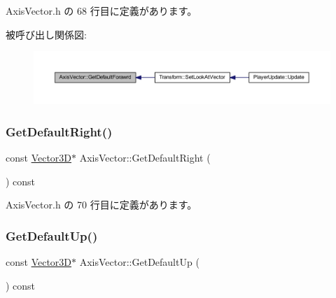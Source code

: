  Axis\+Vector.\+h の 68 行目に定義があります。

被呼び出し関係図\+:
\nopagebreak
\begin{figure}[H]
\begin{center}
\leavevmode
\includegraphics[width=350pt]{class_axis_vector_a83ead17514eb08954dc74c0e72b6158c_icgraph}
\end{center}
\end{figure}
\mbox{\label{class_axis_vector_aacf0879e0b9ace6cfbd29c8a300cd960}} 
\subsubsection{\texorpdfstring{Get\+Default\+Right()}{GetDefaultRight()}}
{\footnotesize\ttfamily const \mbox{\hyperlink{class_vector3_d}{Vector3D}}$\ast$ Axis\+Vector\+::\+Get\+Default\+Right (\begin{DoxyParamCaption}{ }\end{DoxyParamCaption}) const\hspace{0.3cm}{\ttfamily [inline]}}



 Axis\+Vector.\+h の 70 行目に定義があります。

\mbox{\label{class_axis_vector_a32f68ef0864e7b589d3c1996a61e11fc}} 
\subsubsection{\texorpdfstring{Get\+Default\+Up()}{GetDefaultUp()}}
{\footnotesize\ttfamily const \mbox{\hyperlink{class_vector3_d}{Vector3D}}$\ast$ Axis\+Vector\+::\+Get\+Default\+Up (\begin{DoxyParamCaption}{ }\end{DoxyParamCaption}) const\hspace{0.3cm}{\ttfamily [inline]}}



